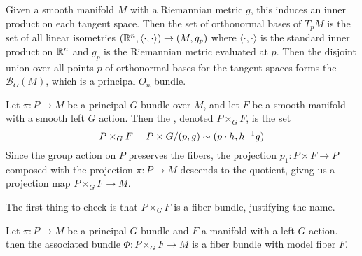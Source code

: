 %
\begin{exmp}
Given a smooth manifold $M$ with a Riemannian metric $g$, this induces an inner
product on each tangent space. Then the set of orthonormal bases of $T_pM$ is the
set of all linear isometries $(\mathbb{R}^n, \langle\cdot,\cdot\rangle) \to (M, g_p)$
where $\langle\cdot,\cdot\rangle$ is the standard inner product on $\mathbb{R}^n$ and
$g_p$ is the Riemannian metric evaluated at $p$. Then the disjoint union over
all points $p$ of orthonormal bases for the tangent spaces forms the
 $\mathcal{B}_O(M)$, which is a principal $O_n$
bundle.
\end{exmp}
%
\begin{defn}
Let $\pi : P \to M$ be a principal $G$-bundle over $M$, and let $F$ be a
smooth manifold with a smooth left $G$ action. Then the , denoted $P \times_G F$, is the set
\[
P \times_G F = P \times G / (p,g) \sim (p\cdot h, h^{-1} g)
\]
Since the group action on $P$ preserves the fibers, the projection
$p_1 : P \times F \to P$ composed with the projection $\pi : P \to M$
descends to the quotient, givng us a projection map
$P \times_G F \to M$.
\end{defn}
%
The first thing to check is that $P \times_G F$ is a fiber bundle, justifying
the name.
%
\begin{prop}
Let $\pi : P \to M$ be a principal $G$-bundle and $F$ a manifold with a left $G$ action.
then the associated bundle $ \Phi : P \times_G F \to M$ is a fiber bundle with
model fiber $F$.
\end{prop}
%
